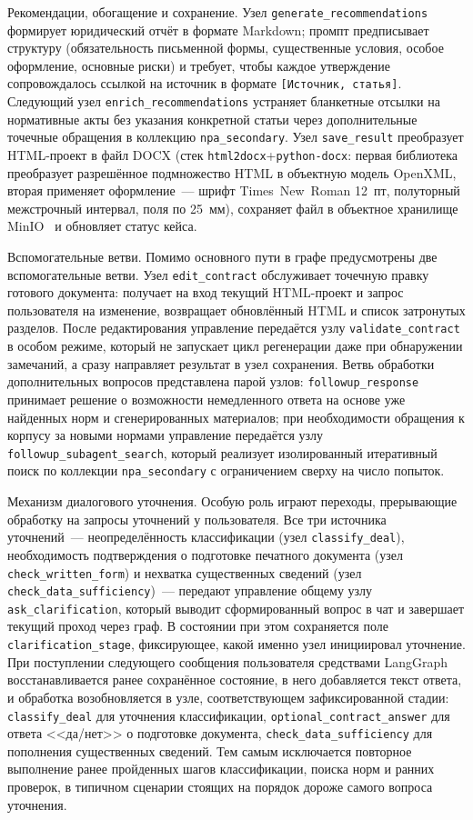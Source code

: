 Рекомендации, обогащение и сохранение. Узел \texttt{generate\_recommendations} формирует юридический отчёт в формате Markdown; промпт предписывает структуру (обязательность письменной формы, существенные условия, особое оформление, основные риски) и требует, чтобы каждое утверждение сопровождалось ссылкой на источник в формате \texttt{[Источник, статья]}. Следующий узел \texttt{enrich\_recommendations} устраняет бланкетные отсылки на нормативные акты без указания конкретной статьи через дополнительные точечные обращения в коллекцию \texttt{npa\_secondary}. Узел \texttt{save\_result} преобразует HTML-проект в файл DOCX (стек \texttt{html2docx}+\texttt{python-docx}: первая библиотека преобразует разрешённое подмножество HTML в объектную модель OpenXML, вторая применяет оформление~--- шрифт Times~New~Roman 12~пт, полуторный межстрочный интервал, поля по 25~мм), сохраняет файл в объектное хранилище MinIO~\cite{minio_docs} и обновляет статус кейса.

Вспомогательные ветви. Помимо основного пути в графе предусмотрены две вспомогательные ветви. Узел \texttt{edit\_contract} обслуживает точечную правку готового документа: получает на вход текущий HTML-проект и запрос пользователя на изменение, возвращает обновлённый HTML и список затронутых разделов. После редактирования управление передаётся узлу \texttt{validate\_contract} в особом режиме, который не запускает цикл регенерации даже при обнаружении замечаний, а сразу направляет результат в узел сохранения. Ветвь обработки дополнительных вопросов представлена парой узлов: \texttt{followup\_response} принимает решение о возможности немедленного ответа на основе уже найденных норм и сгенерированных материалов; при необходимости обращения к корпусу за новыми нормами управление передаётся узлу \texttt{followup\_subagent\_search}, который реализует изолированный итеративный поиск по коллекции \texttt{npa\_secondary} с ограничением сверху на число попыток.

Механизм диалогового уточнения. Особую роль играют переходы, прерывающие обработку на запросы уточнений у пользователя. Все три источника уточнений~--- неопределённость классификации (узел \texttt{classify\_deal}), необходимость подтверждения о подготовке печатного документа (узел \texttt{check\_written\_form}) и нехватка существенных сведений (узел \texttt{check\_data\_sufficiency})~--- передают управление общему узлу \texttt{ask\_clarification}, который выводит сформированный вопрос в чат и завершает текущий проход через граф. В состоянии при этом сохраняется поле \texttt{clarification\_stage}, фиксирующее, какой именно узел инициировал уточнение. При поступлении следующего сообщения пользователя средствами LangGraph восстанавливается ранее сохранённое состояние, в него добавляется текст ответа, и обработка возобновляется в узле, соответствующем зафиксированной стадии: \texttt{classify\_deal} для уточнения классификации, \texttt{optional\_contract\_answer} для ответа <<да/нет>> о подготовке документа, \texttt{check\_data\_sufficiency} для пополнения существенных сведений. Тем самым исключается повторное выполнение ранее пройденных шагов классификации, поиска норм и ранних проверок, в типичном сценарии стоящих на порядок дороже самого вопроса уточнения.

